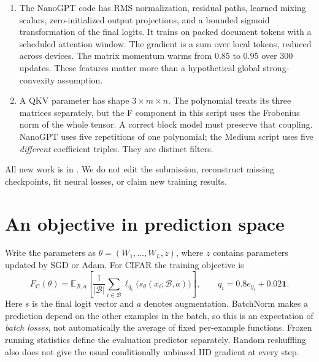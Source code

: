 \documentclass[11pt]{article}
\newcommand{\E}{\mathbb E}
\begin{document}
\begin{enumerate}
There are multiple consecutive assignments to ; the last
one wins. They cannot all describe one executed run.
\item The NanoGPT code has RMS normalization, residual paths, learned
mixing scalars, zero-initialized output projections, and a bounded sigmoid
transformation of the final logits. It trains on packed document tokens
with a scheduled attention window. The gradient is a sum over local
tokens, reduced across devices. The matrix momentum warms from $0.85$ to
$0.95$ over 300 updates. These features matter more than a hypothetical
global strong-convexity assumption.
\item A QKV parameter has shape $3\times m\times n$. The polynomial treats
its three matrices separately, but the F component in this script uses
the Frobenius norm of the whole tensor. A correct block model must preserve
that coupling. NanoGPT uses five repetitions of one polynomial; the Medium
script uses five \emph{different} coefficient triples. They are distinct
filters.
\end{enumerate}

All new work is in . We do not edit the submission,
reconstruct missing checkpoints, fit neural losses, or claim new training
results.

\section{An objective in prediction space}

Write the parameters as $\theta=(W_1,\ldots,W_L,z)$, where $z$ contains
parameters updated by SGD or Adam. For CIFAR the training objective is
\begin{equation}\label{eq:cifar-objective}
 F_{\mathrm C}(\theta)=\E_{\mathcal B,a}\left[
 \frac1{|\mathcal B|}\sum_{i\in\mathcal B}
 \ell_{q_i}\big(s_\theta(x_i;\mathcal B,a)\big)\right],
 \qquad q_i=0.8e_{y_i}+0.02\boldsymbol 1.
\end{equation}
Here $s$ is the final logit vector and $a$ denotes augmentation. BatchNorm
makes a prediction depend on the other examples in the batch, so this is
an expectation of \emph{batch losses}, not automatically the average of
fixed per-example functions. Frozen running statistics define the evaluation
predictor separately. Random reshuffling also does not give the usual
conditionally unbiased IID gradient at every step.
\end{document}

